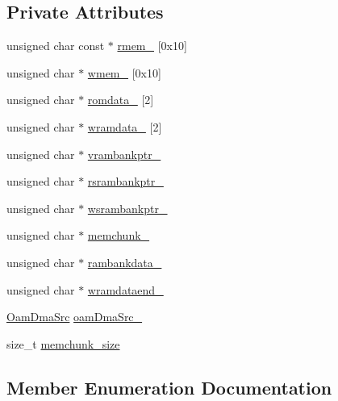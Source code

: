 \subsection*{Private Attributes}
\begin{DoxyCompactItemize}
\item 
unsigned char const  $\ast$ \hyperlink{classgambatte_1_1MemPtrs_a0c7401bcfa64bb8b2180d04381169c81}{rmem\+\_\+} \mbox{[}0x10\mbox{]}
\item 
unsigned char $\ast$ \hyperlink{classgambatte_1_1MemPtrs_afeeb42a3c48d2f0eb588e2b3bc3ad78a}{wmem\+\_\+} \mbox{[}0x10\mbox{]}
\item 
unsigned char $\ast$ \hyperlink{classgambatte_1_1MemPtrs_a7184987957516c7f8116ab391a2546d1}{romdata\+\_\+} \mbox{[}2\mbox{]}
\item 
unsigned char $\ast$ \hyperlink{classgambatte_1_1MemPtrs_abb906547da5c78cbfc41e158a44b297f}{wramdata\+\_\+} \mbox{[}2\mbox{]}
\item 
unsigned char $\ast$ \hyperlink{classgambatte_1_1MemPtrs_ac970531db21355617f59475f3affeecf}{vrambankptr\+\_\+}
\item 
unsigned char $\ast$ \hyperlink{classgambatte_1_1MemPtrs_aab734c5c626feeef678c8b961c49cc38}{rsrambankptr\+\_\+}
\item 
unsigned char $\ast$ \hyperlink{classgambatte_1_1MemPtrs_a12336067daec4b180c396003a8b74645}{wsrambankptr\+\_\+}
\item 
unsigned char $\ast$ \hyperlink{classgambatte_1_1MemPtrs_a86d5c1b44d933f28e3c2b21f8cedde41}{memchunk\+\_\+}
\item 
unsigned char $\ast$ \hyperlink{classgambatte_1_1MemPtrs_a3aad306915c66a8f3de36fced3bdab6f}{rambankdata\+\_\+}
\item 
unsigned char $\ast$ \hyperlink{classgambatte_1_1MemPtrs_a81f51d77dc7a063783d7c6365d327471}{wramdataend\+\_\+}
\item 
\hyperlink{namespacegambatte_a2c5520a5fadf732ba8907450d802f51b}{Oam\+Dma\+Src} \hyperlink{classgambatte_1_1MemPtrs_ac824bf1a5a30192fa6828e7f2d2ab8b5}{oam\+Dma\+Src\+\_\+}
\item 
size\+\_\+t \hyperlink{classgambatte_1_1MemPtrs_ad79951aa7a0eaf0f85b8034caa29c565}{memchunk\+\_\+size}
\end{DoxyCompactItemize}


\subsection{Member Enumeration Documentation}
\mbox{\label{classgambatte_1_1MemPtrs_ad83f0b1d75651c98df85250dcf197362}} 
